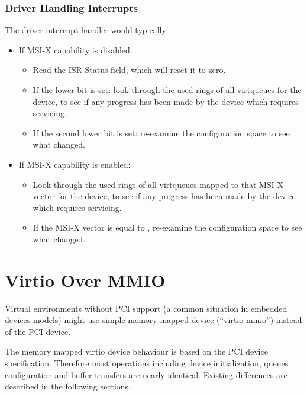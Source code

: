 \subsubsection{Driver Handling Interrupts}\label{sec:Virtio Transport Options / Virtio Over PCI Bus / PCI-specific Initialization And Device Operation / Driver Handling Interrupts}
The driver interrupt handler would typically:

\begin{itemize}
  \item If MSI-X capability is disabled:
    \begin{itemize}
      \item Read the ISR Status field, which will reset it to zero.
      \item If the lower bit is set:
        look through the used rings of all virtqueues for the
        device, to see if any progress has been made by the device
        which requires servicing.
      \item If the second lower bit is set:
        re-examine the configuration space to see what changed.
    \end{itemize}
  \item If MSI-X capability is enabled:
    \begin{itemize}
      \item
        Look through the used rings of
        all virtqueues mapped to that MSI-X vector for the
        device, to see if any progress has been made by the device
        which requires servicing.
      \item
        If the MSI-X vector is equal to ,
        re-examine the configuration space to see what changed.
    \end{itemize}
\end{itemize}

\section{Virtio Over MMIO}\label{sec:Virtio Transport Options / Virtio Over MMIO}

Virtual environments without PCI support (a common situation in
embedded devices models) might use simple memory mapped device
(``virtio-mmio'') instead of the PCI device.

The memory mapped virtio device behaviour is based on the PCI
device specification. Therefore most operations including device
initialization, queues configuration and buffer transfers are
nearly identical. Existing differences are described in the
following sections.

